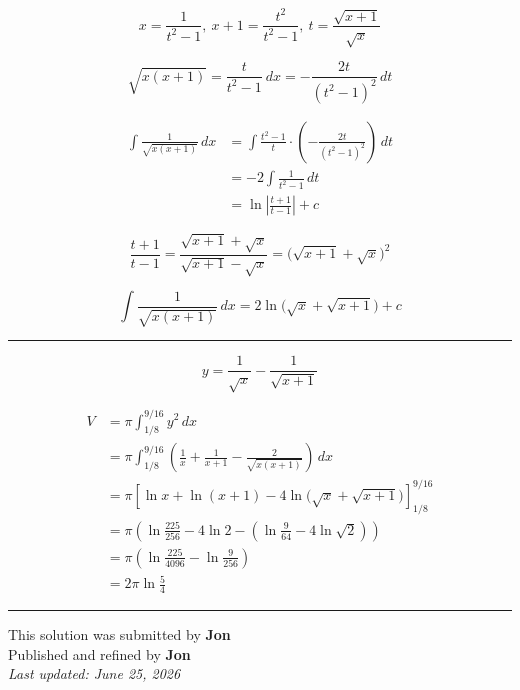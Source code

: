 \documentclass[12pt]{article}
\begin{document}
\newcommand{\ds}{\displaystyle}

$$x=\frac1{t^2-1}, \ x+1=\frac{t^2}{t^2-1},\ t=\frac{\sqrt{x+1}}{\sqrt{x}}$$

$$\sqrt{x(x+1)}=\frac{t}{t^2-1}\  dx=-\frac{2t}{(t^2-1)^2}\,dt$$

\begin{align*}
\int\frac1{\sqrt{x(x+1)}}\,dx
&=\int \frac{t^2-1}{t}\cdot\left(-\frac{2t}{(t^2-1)^2}\right)\,dt\\
&=-2\int\frac1{t^2-1}\,dt\\
&=\ln\left|\frac{t+1}{t-1}\right|+c
\end{align*}


$$\frac{t+1}{t-1}=\frac{\sqrt{x+1}+\sqrt{x}}{\sqrt{x+1}-\sqrt{x}}=\bigl(\sqrt{x+1}+\sqrt{x}\bigr)^2$$

$$\int\frac1{\sqrt{x(x+1)}}\,dx=2\ln\bigl(\sqrt{x}+\sqrt{x+1}\bigr)+c$$

\bigskip\hrule\bigskip

$$y=\frac1{\sqrt{x}}-\frac1{\sqrt{x+1}}$$

\begin{align*}
V
&=\pi\int_{1/8}^{9/16}y^2\,dx\\
&=\pi\int_{1/8}^{9/16}\left(\frac1x+\frac1{x+1}-\frac2{\sqrt{x(x+1)}}\right)\,dx\\
&=\pi\left[\ln x+\ln(x+1)-4\ln\bigl(\sqrt{x}+\sqrt{x+1}\bigr)\right]_{1/8}^{9/16}\\
&=\pi\left(\ln\frac{225}{256}-4\ln2-\left(\ln\frac9{64}-4\ln\sqrt2\right)\right)\\
&=\pi\left(\ln\frac{225}{4096}-\ln\frac9{256}\right)\\
&=2\pi\ln\frac54
\end{align*}

\bigskip
\hrule
\begin{center}
    This solution was submitted by \textbf{Jon}\\[4pt]
    Published and refined by \textbf{Jon}\\[8pt]
    \textit{Last updated: June 25, 2026}
\end{center}
\end{document}
